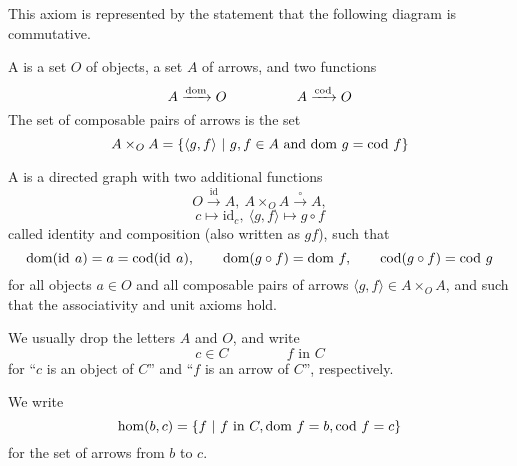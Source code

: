 \documentclass[11pt,letterpaper]{jacky}
\begin{document}
\begin{defi}
\begin{itemize}
            This axiom is represented by the statement that the following
            diagram is commutative.
            \begin{center}
            \end{center}
    \end{itemize}
\end{defi}

\begin{defi}
    A  is a set $O$ of objects, a set $A$ of arrows, and
    two functions
    \[A\xrightarrow{\dom}O\hspace{50pt}A\xrightarrow{\cod}O\]
    The set of composable pairs of arrows is the set
    \[A\times_OA=\{\langle g,f\rangle\ |\ g,f\in A
        \text{ and }\dom[g]=\cod[f]\}\]
\end{defi}

\begin{defi}
    A  is a directed graph with two additional functions
    \[O\xrightarrow{\text{id}}A,\ A\times_OA\xrightarrow{\circ}A,\]
    \[c\mapsto\text{id}_c,\ \langle g,f\rangle\mapsto g\circ f\]
    called identity and composition (also written as $gf$), such that
    \[\dom(\id\ a)=a=\cod(\id\ a),\hspace{20pt}\dom(g\circ
    f)=\dom[f],\hspace{20pt}\cod(g\circ f)=\cod[g]\]
    for all objects $a\in O$ and all composable pairs of arrows $\langle
    g,f\rangle\in A\times_OA$, and such that the associativity and unit axioms
    hold.
\end{defi}

\begin{note}
    We usually drop the letters $A$ and $O$, and write
    \[c\in C\hspace{50pt}f\text{ in }C\]
    for ``$c$ is an object of $C$'' and ``$f$ is an arrow of $C$'',
    respectively.
\end{note}

\begin{defi}
    We write
    \[\hom(b,c)=\{f\ |\ f\text{ in }C,\dom[f]=b, \cod[f]=c\}\]
    for the set of arrows from $b$ to $c$.
\end{defi}
\end{document}
